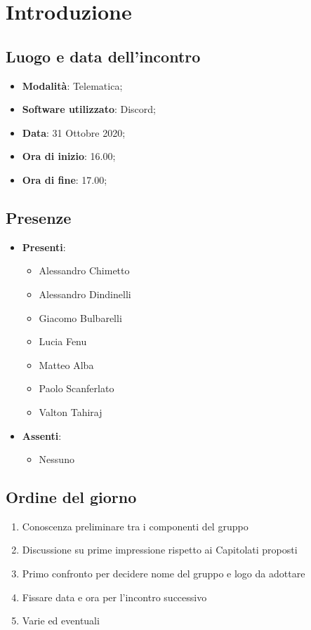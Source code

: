\documentclass[]{article}
\begin{document}
	

	\newpage


	\section{Introduzione}
	\subsection{Luogo e data dell'incontro}
	\begin{itemize}
		\item \textbf{Modalità}: Telematica;
		\item \textbf{Software utilizzato}: Discord;
		\item \textbf{Data}: 31 Ottobre 2020;
		\item \textbf{Ora di inizio}: 16.00;
		\item \textbf{Ora di fine}: 17.00;
	\end{itemize}

	\subsection{Presenze}
	\begin{itemize}
		\item \textbf{Presenti}:
		\begin{itemize}
			\item Alessandro Chimetto
			\item Alessandro Dindinelli
			\item Giacomo Bulbarelli
			\item Lucia Fenu
			\item Matteo Alba
			\item Paolo Scanferlato
			\item Valton Tahiraj
		\end{itemize}
		\item \textbf{Assenti}:
		\begin{itemize}
			\item Nessuno
		\end{itemize}
	\end{itemize}


	\subsection{Ordine del giorno}
	\begin{enumerate}
		\item Conoscenza preliminare tra i componenti del gruppo
		\item Discussione su prime impressione rispetto ai Capitolati proposti
		\item Primo confronto per decidere nome del gruppo e logo da adottare
		\item Fissare data e ora per l'incontro successivo
		\item Varie ed eventuali
	\end{enumerate}
\end{document}
